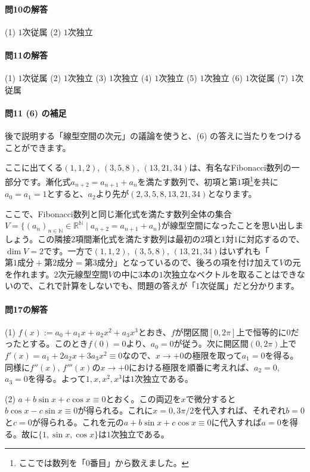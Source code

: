 \paragraph{問10の解答} (1) $1$次従属 (2) $1$次独立

\paragraph{問11の解答} (1) $1$次従属 (2) $1$次独立 (3) $1$次独立 (4) $1$次独立 (5) $1$次独立 (6) $1$次従属 (7) $1$次従属

\paragraph{問11 (6) の補足} 後で説明する「線型空間の次元」の議論を使うと、(6) の答えに当たりをつけることができます。

ここに出てくる$(1, 1, 2)$, $(3, 5, 8)$, $(13, 21, 34)$は、有名なFibonacci数列の一部分です。漸化式$a_{n + 2} = a_{n + 1} + a_n$を満たす数列で、初項と第$1$項\footnote{ここでは数列を「$0$番目」から数えました。}を共に$a_0 = a_1 = 1$とすると、$a_2$より先が$(2, 3, 5, 8, 13, 21, 34)$となります。

ここで、Fibonacci数列と同じ漸化式を満たす数列全体の集合$V = \{(a_n)_{n \in \mathbb{N}} \in \mathbb{R}^{\mathbb{N}} \mid a_{n + 2} = a_{n + 1} + a_n\}$が線型空間になったことを思い出しましょう。この隣接$2$項間漸化式を満たす数列は最初の$2$項と$1$対$1$に対応するので、$\dim V = 2$です。一方で$(1, 1, 2)$, $(3, 5, 8)$, $(13, 21, 34)$はいずれも「$\text{第$1$成分} + \text{第$2$成分} = \text{第$3$成分}$」となっているので、後ろの項を付け加えて$V$の元を作れます。$2$次元線型空間$V$の中に$3$本の$1$次独立なベクトルを取ることはできないので、これで計算をしないでも、問題の答えが「$1$次従属」だと分かります。

\paragraph{問17の解答}
(1) $f(x) := a_0 + a_1 x + a_2 x^2 + a_3 x^3$とおき、$f$が閉区間$[0, 2\pi]$上で恒等的に$0$だったとする。このとき$f(0) = 0$より、$a_0 = 0$が従う。次に開区間$(0, 2\pi)$上で$f'(x) = a_1 + 2a_2 x + 3a_3 x^2 \equiv 0$なので、$x\rightarrow +0$の極限を取って$a_1 = 0$を得る。同様に$f''(x)$, $f'''(x)$の$x\rightarrow +0$における極限を順番に考えれば、$a_2 = 0$, $a_3 = 0$を得る。よって$1, x, x^2, x^3$は$1$次独立である。

\noindent (2) $a + b\sin x + c \cos x \equiv 0$とおく。この両辺を$x$で微分すると$b\cos x - c\sin x \equiv 0$が得られる。これに$x = 0, 3\pi/2$を代入すれば、それぞれ$b = 0$と$c = 0$が得られる。これを元の$a + b\sin x + c \cos x \equiv 0$に代入すれば$a = 0$を得る。故に$\{1, \sin x, \cos x\}$は$1$次独立である。

